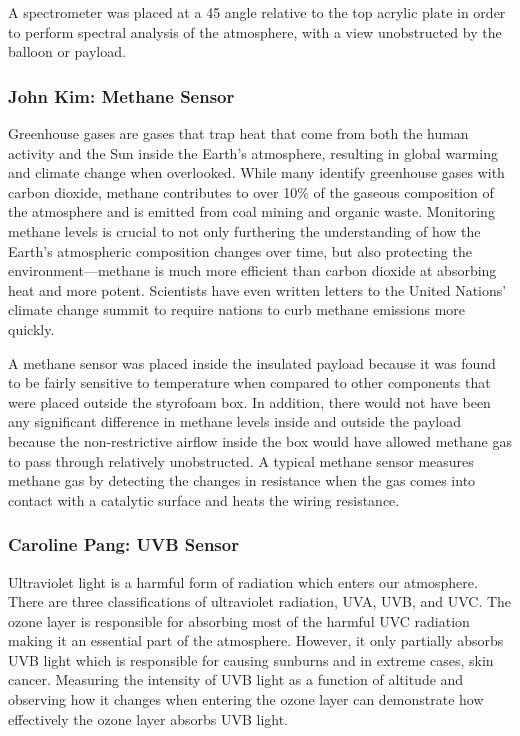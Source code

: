 \documentclass[12pt,]{article}
\begin{document}
A spectrometer was placed at a 45 \degree angle relative to the top
acrylic plate in order to perform spectral analysis of the atmosphere,
with a view unobstructed by the balloon or payload.

\subsubsection{John Kim: Methane Sensor}\label{john-kim-methane-sensor}

Greenhouse gases are gases that trap heat that come from both the human
activity and the Sun inside the Earth's atmosphere, resulting in global
warming and climate change when overlooked. While many identify
greenhouse gases with carbon dioxide, methane contributes to over 10\%
of the gaseous composition of the atmosphere and is emitted from coal
mining and organic waste. Monitoring methane levels is crucial to not
only furthering the understanding of how the Earth's atmospheric
composition changes over time, but also protecting the
environment---methane is much more efficient than carbon dioxide at
absorbing heat and more potent. Scientists have even written letters to
the United Nations' climate change summit to require nations to curb
methane emissions more quickly.

A methane sensor was placed inside the insulated payload because it was
found to be fairly sensitive to temperature when compared to other
components that were placed outside the styrofoam box. In addition,
there would not have been any significant difference in methane levels
inside and outside the payload because the non-restrictive airflow
inside the box would have allowed methane gas to pass through relatively
unobstructed. A typical methane sensor measures methane gas by detecting
the changes in resistance when the gas comes into contact with a
catalytic surface and heats the wiring resistance.

\subsubsection{Caroline Pang: UVB
Sensor}\label{caroline-pang-uvb-sensor}

Ultraviolet light is a harmful form of radiation which enters our
atmosphere. There are three classifications of ultraviolet radiation,
UVA, UVB, and UVC. The ozone layer is responsible for absorbing most of
the harmful UVC radiation making it an essential part of the atmosphere.
However, it only partially absorbs UVB light which is responsible for
causing sunburns and in extreme cases, skin cancer. Measuring the
intensity of UVB light as a function of altitude and observing how it
changes when entering the ozone layer can demonstrate how effectively
the ozone layer absorbs UVB light.
\end{document}
